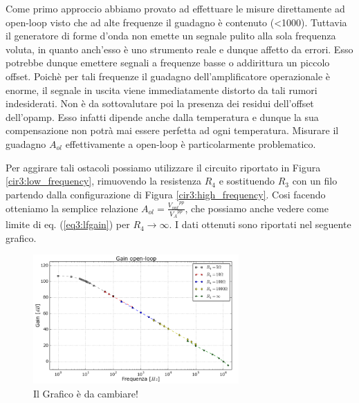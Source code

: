 Come primo approccio abbiamo provato ad effettuare le misure direttamente ad open-loop visto che ad alte frequenze il guadagno è contenuto (\num{<1000}).
Tuttavia il generatore di forme d'onda non emette un segnale pulito alla sola frequenza voluta, in quanto anch'esso è uno strumento reale e dunque affetto da errori.
Esso potrebbe dunque emettere segnali a frequenze basse o addirittura un piccolo offset.
Poichè per tali frequenze il guadagno dell'amplificatore operazionale è enorme, il segnale in uscita viene immediatamente distorto da tali rumori indesiderati.
Non è da sottovalutare poi la presenza dei residui dell'offset dell'opamp.
Esso infatti dipende anche dalla temperatura e dunque la sua compensazione non potrà mai essere perfetta ad ogni temperatura.
Misurare il guadagno $A_{ol}$ effettivamente a open-loop è particolarmente problematico.

Per aggirare tali ostacoli possiamo utilizzare il circuito riportato in Figura \ref{cir3:low_frequency}, rimuovendo la resistenza $R_4$ e sostituendo $R_3$ con un filo partendo dalla configurazione di Figura \ref{cir3:high_frequency}.
Cosi facendo otteniamo la semplice relazione $A_{ol}=\frac{{V_{out}}^{pp}}{{V_A}^{pp}}$, che possiamo anche vedere come limite di eq. (\ref{eq3:lfgain}) per $R_4 \rightarrow \infty$.
I dati ottenuti sono riportati nel seguente grafico. 

\begin{figure}
	\centering
	\includegraphics[width=0.7\textwidth]{../E03/latex/figure_1.png}
	\caption{Il Grafico è da cambiare!}
  \label{cir3:gain_open_loop}
\end{figure}
